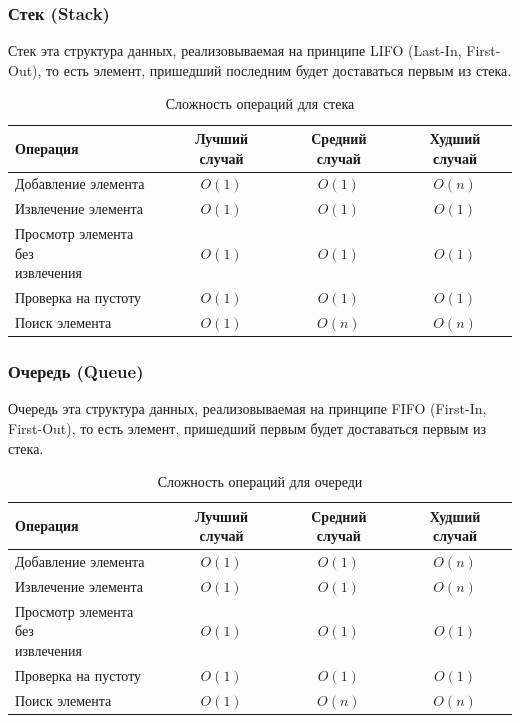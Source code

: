 \documentclass[a4paper,12pt]{article}
\begin{document}
\subsubsection{Стек (Stack)}
\label{subsubsec:стек-stack}

Стек эта структура данных, реализовываемая на принципе LIFO (Last-In, First-Out), то есть элемент, пришедший последним будет доставаться первым из стека.

\begin{table}[H]
    \centering
    \begin{tabular}{|l|c|c|c|}
        \hline
        Операция & Лучший случай & Средний случай & Худший случай \\
        \hline
        Добавление элемента & $O(1)$ & $O(1)$ & $O(n)$ \\
        \hline
        Извлечение элемента & $O(1)$ & $O(1)$ & $O(1)$ \\
        \hline
        \makecell[l]{Просмотр элемента без \\извлечения} & $O(1)$ & $O(1)$ & $O(1)$ \\
        \hline
        Проверка на пустоту & $O(1)$ & $O(1)$ & $O(1)$ \\
        \hline
        Поиск элемента & $O(1)$ & $O(n)$ & $O(n)$ \\
        \hline
    \end{tabular}
    \caption{Сложность операций для стека}
\end{table}

\subsubsection{Очередь (Queue)}
\label{subsubsec:очередь-queue}

Очередь эта структура данных, реализовываемая на принципе FIFO (First-In, First-Out), то есть элемент, пришедший первым будет доставаться первым из стека.

\begin{table}[H]
    \centering
    \begin{tabular}{|l|c|c|c|}
        \hline
        Операция & Лучший случай & Средний случай & Худший случай \\
        \hline
        Добавление элемента & $O(1)$ & $O(1)$ & $O(n)$ \\
        \hline
        Извлечение элемента & $O(1)$ & $O(1)$ & $O(n)$ \\
        \hline
        \makecell[l]{Просмотр элемента без \\извлечения} & $O(1)$ & $O(1)$ & $O(1)$ \\
        \hline
        Проверка на пустоту & $O(1)$ & $O(1)$ & $O(1)$ \\
        \hline
        Поиск элемента & $O(1)$ & $O(n)$ & $O(n)$ \\
        \hline
    \end{tabular}
    \caption{Сложность операций для очереди}
\end{table}
\end{document}
